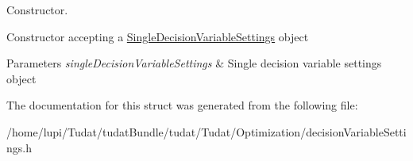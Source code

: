 Constructor. 

Constructor accepting a \hyperlink{structtudat_1_1optimization_1_1SingleDecisionVariableSettings}{Single\+Decision\+Variable\+Settings} object 
\begin{DoxyParams}{Parameters}
{\em single\+Decision\+Variable\+Settings} & Single decision variable settings object \\
\hline
\end{DoxyParams}


The documentation for this struct was generated from the following file\+:\begin{DoxyCompactItemize}
\item 
/home/lupi/\+Tudat/tudat\+Bundle/tudat/\+Tudat/\+Optimization/decision\+Variable\+Settings.\+h\end{DoxyCompactItemize}
